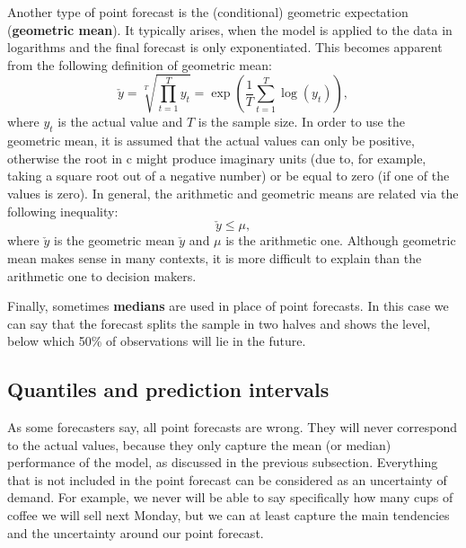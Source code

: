 \documentclass[
]{book}
\theoremstyle{definition}
\theoremstyle{definition}
\theoremstyle{definition}
\theoremstyle{definition}
\theoremstyle{remark}
\begin{document}
Another type of point forecast is the (conditional) geometric expectation (\textbf{geometric mean}). It typically arises, when the model is applied to the data in logarithms and the final forecast is only exponentiated. This becomes apparent from the following definition of geometric mean:
\begin{equation}
    \check{y} = \sqrt[T]{\prod_{t=1}^T y_t} = \exp \left(\frac{1}{T} \sum_{t=1}^T \log(y_t) \right) ,
    \label{eq:GeoMean}
\end{equation}
where \(y_t\) is the actual value and \(T\) is the sample size. In order to use the geometric mean, it is assumed that the actual values can only be positive, otherwise the root in c might produce imaginary units (due to, for example, taking a square root out of a negative number) or be equal to zero (if one of the values is zero). In general, the arithmetic and geometric means are related via the following inequality:
\begin{equation}
    \check{y} \leq \mu ,
    \label{eq:GeoAndArithMeans}
\end{equation}
where \(\check{y}\) is the geometric mean \(\check{y}\) and \(\mu\) is the arithmetic one. Although geometric mean makes sense in many contexts, it is more difficult to explain than the arithmetic one to decision makers.

Finally, sometimes \textbf{medians} are used in place of point forecasts. In this case we can say that the forecast splits the sample in two halves and shows the level, below which 50\% of observations will lie in the future.

\hypertarget{quantiles-and-prediction-intervals}{%
\subsection{Quantiles and prediction intervals}\label{quantiles-and-prediction-intervals}}

As some forecasters say, all point forecasts are wrong. They will never correspond to the actual values, because they only capture the mean (or median) performance of the model, as discussed in the previous subsection. Everything that is not included in the point forecast can be considered as an uncertainty of demand. For example, we never will be able to say specifically how many cups of coffee we will sell next Monday, but we can at least capture the main tendencies and the uncertainty around our point forecast.
\end{document}
